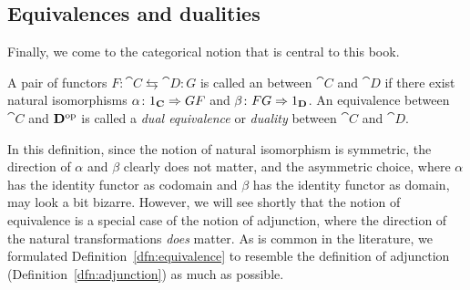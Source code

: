 \subsection*{Equivalences and dualities}
Finally, we come to the categorical notion that is central to this book.
\begin{definition}\label{dfn:equivalence}
  A pair of functors $F \colon \cat{C} \leftrightarrows \cat{D} \colon G$ is called an  between $\cat{C}$ and $\cat{D}$ if there exist natural isomorphisms $\alpha \colon 1_{\mathbf{C}} \Rightarrow GF$ and $\beta \colon FG \Rightarrow 1_{\mathbf{D}}$.
An equivalence between $\cat{C}$ and $\mathbf{D}^{\mathrm{op}}$ is called a \emph{dual equivalence} or \emph{duality} between $\cat{C}$ and $\cat{D}$.
\end{definition}

In this definition, since the notion of natural isomorphism is symmetric, the direction of $\alpha$ and $\beta$ clearly does not matter, and the asymmetric choice, where $\alpha$ has the identity functor as codomain and $\beta$ has the identity functor as domain, may look a bit bizarre. However, we will see shortly that the notion of equivalence is a special case of the notion of adjunction, where the direction of the natural transformations \emph{does} matter. As is common in the literature, we formulated Definition~\ref{dfn:equivalence} to resemble the definition of adjunction (Definition~\ref{dfn:adjunction}) as much as possible.

